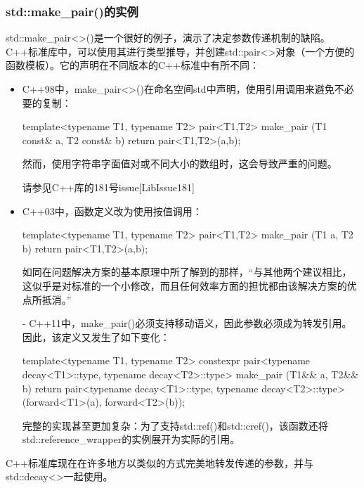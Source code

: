 \subsubsection{std::make\_pair()的实例}

std::make\_pair<>()是一个很好的例子，演示了决定参数传递机制的缺陷。C++标准库中，可以使用其进行类型推导，并创建std::pair<>对象（一个方便的函数模板）。它的声明在不同版本的C++标准中有所不同：

\begin{itemize}
\item
C++98中，make\_pair<>()在命名空间std中声明，使用引用调用来避免不必要的复制：

\begin{cpp}
template<typename T1, typename T2>
pair<T1,T2> make_pair (T1 const& a, T2 const& b)
{
	return pair<T1,T2>(a,b);
}
\end{cpp}

然而，使用字符串字面值对或不同大小的数组时，这会导致严重的问题。

\begin{notice}
请参见C++库的181号issue[LibIssue181]
\end{notice}

\item
C++03中，函数定义改为使用按值调用：

\begin{cpp}
template<typename T1, typename T2>
pair<T1,T2> make_pair (T1 a, T2 b)
{
	return pair<T1,T2>(a,b);
}
\end{cpp}

如同在问题解决方案的基本原理中所了解到的那样，“与其他两个建议相比，这似乎是对标准的一个小修改，而且任何效率方面的担忧都由该解决方案的优点所抵消。”

\item[-]
C++11中，make\_pair()必须支持移动语义，因此参数必须成为转发引用。因此，该定义又发生了如下变化：

\begin{cpp}
template<typename T1, typename T2>
constexpr pair<typename decay<T1>::type, typename decay<T2>::type>
make_pair (T1&& a, T2&& b)
{
	return pair<typename decay<T1>::type,
				typename decay<T2>::type>(forward<T1>(a),
										  forward<T2>(b));
}
\end{cpp}

完整的实现甚至更加复杂：为了支持std::ref()和std::cref()，该函数还将std::reference\_wrapper的实例展开为实际的引用。
\end{itemize}

C++标准库现在在许多地方以类似的方式完美地转发传递的参数，并与std::decay<>一起使用。


















